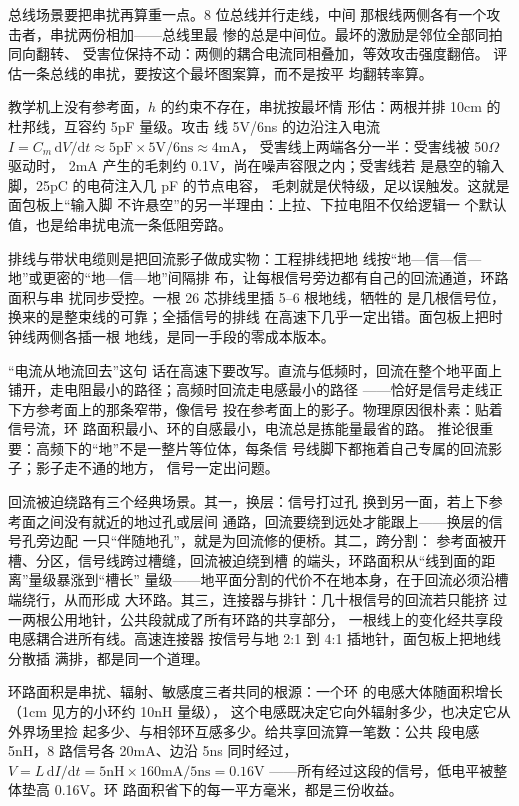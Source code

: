 总线场景要把串扰再算重一点。8 位总线并行走线，中间
那根线两侧各有一个攻击者，串扰两份相加——总线里最
惨的总是中间位。最坏的激励是邻位全部同拍同向翻转、
受害位保持不动：两侧的耦合电流同相叠加，等效攻击强度翻倍。
评估一条总线的串扰，要按这个最坏图案算，而不是按平
均翻转率算。

教学机上没有参考面，$h$ 的约束不存在，串扰按最坏情
形估：两根并排 10cm 的杜邦线，互容约 5pF 量级。攻击
线 5V/6ns 的边沿注入电流
$I=C_m\,\mathrm{d}V/\mathrm{d}t\approx5\text{pF}\times5\text{V}/6\text{ns}\approx4$mA，
受害线上两端各分一半：受害线被 50$\Omega$ 驱动时，
2mA 产生的毛刺约 0.1V，尚在噪声容限之内；受害线若
是悬空的输入脚，25pC 的电荷注入几 pF 的节点电容，
毛刺就是伏特级，足以误触发。这就是面包板上“输入脚
不许悬空”的另一半理由：上拉、下拉电阻不仅给逻辑一
个默认值，也是给串扰电流一条低阻旁路。

排线与带状电缆则是把回流影子做成实物：工程排线把地
线按“地—信—信—地”或更密的“地—信—地”间隔排
布，让每根信号旁边都有自己的回流通道，环路面积与串
扰同步受控。一根 26 芯排线里插 5--6 根地线，牺牲的
是几根信号位，换来的是整束线的可靠；全插信号的排线
在高速下几乎一定出错。面包板上把时钟线两侧各插一根
地线，是同一手段的零成本版本。

“电流从地流回去”这句
话在高速下要改写。直流与低频时，回流在整个地平面上
铺开，走电阻最小的路径；高频时回流走电感最小的路径
——恰好是信号走线正下方参考面上的那条窄带，像信号
投在参考面上的影子。物理原因很朴素：贴着信号流，环
路面积最小、环的自感最小，电流总是拣能量最省的路。
推论很重要：高频下的“地”不是一整片等位体，每条信
号线脚下都拖着自己专属的回流影子；影子走不通的地方，
信号一定出问题。

回流被迫绕路有三个经典场景。其一，换层：信号打过孔
换到另一面，若上下参考面之间没有就近的地过孔或层间
通路，回流要绕到远处才能跟上——换层的信号孔旁边配
一只“伴随地孔”，就是为回流修的便桥。其二，跨分割：
参考面被开槽、分区，信号线跨过槽缝，回流被迫绕到槽
的端头，环路面积从“线到面的距离”量级暴涨到“槽长”
量级——地平面分割的代价不在地本身，在于回流必须沿槽端绕行，从而形成
大环路。其三，连接器与排针：几十根信号的回流若只能挤
过一两根公用地针，公共段就成了所有环路的共享部分，
一根线上的变化经共享段电感耦合进所有线。高速连接器
按信号与地 2:1 到 4:1 插地针，面包板上把地线分散插
满排，都是同一个道理。

环路面积是串扰、辐射、敏感度三者共同的根源：一个环
的电感大体随面积增长（1cm 见方的小环约 10nH 量级），
这个电感既决定它向外辐射多少，也决定它从外界场里捡
起多少、与相邻环互感多少。给共享回流算一笔数：公共
段电感 5nH，8 路信号各 20mA、边沿 5ns 同时经过，
$V=L\,\mathrm{d}I/\mathrm{d}t=5\text{nH}\times160\text{mA}/5\text{ns}=0.16$V
——所有经过这段的信号，低电平被整体垫高 0.16V。环
路面积省下的每一平方毫米，都是三份收益。


